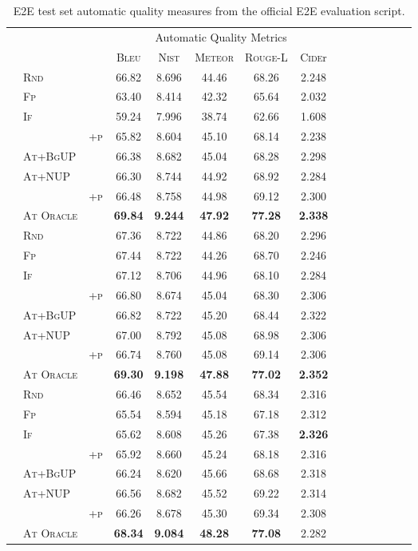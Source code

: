 \begin{table*}
\begin{tabular}{lll c c c c  c c c c  c c c c}
 & & &  \multicolumn{5}{c}{Automatic Quality Metrics} \\
\cmidrule(lr){4-8} 
 & & &  \textsc{Bleu} &  \textsc{Nist} &  \textsc{Meteor} & \textsc{Rouge-L} & \textsc{Cide}r \\
\midrule
\parbox[t]{2mm}{}
&\textsc{Rnd} & &66.82&8.696&44.46&68.26&2.248 \\
&\textsc{Fp} & &63.40&8.414&42.32&65.64&2.032 \\
&\textsc{If} & &59.24&7.996&38.74&62.66&1.608 \\
&  & \textsc{+p}&65.82&8.604&45.10&68.14&2.238 \\
&\textsc{At+BgUP} & &66.38&8.682&45.04&68.28&2.298 \\
&\textsc{At+NUP} & &66.30&8.744&44.92&68.92&2.284 \\
&  & \textsc{+p}&66.48&8.758&44.98&69.12&2.300 \\
&\textsc{At Oracle} & &\textbf{69.84}&\textbf{9.244}&\textbf{47.92}&\textbf{77.28}&\textbf{2.338} \\
\midrule
\parbox[t]{2mm}{}
&\textsc{Rnd} & &67.36&8.722&44.86&68.20&2.296 \\
&\textsc{Fp} & &67.44&8.722&44.26&68.70&2.246 \\
&\textsc{If} & &67.12&8.706&44.96&68.10&2.284 \\
&  & \textsc{+p}&66.80&8.674&45.04&68.30&2.306 \\
&\textsc{At+BgUP} & &66.82&8.722&45.20&68.44&2.322 \\
&\textsc{At+NUP} & &67.00&8.792&45.08&68.98&2.306 \\
&  & \textsc{+p}&66.74&8.760&45.08&69.14&2.306 \\
&\textsc{At Oracle} & &\textbf{69.30}&\textbf{9.198}&\textbf{47.88}&\textbf{77.02}&\textbf{2.352} \\
\midrule
\parbox[t]{2mm}{}
&\textsc{Rnd} & &66.46&8.652&45.54&68.34&2.316 \\
&\textsc{Fp} & &65.54&8.594&45.18&67.18&2.312 \\
&\textsc{If} & &65.62&8.608&45.26&67.38&\textbf{2.326} \\
&  & \textsc{+p}&65.92&8.660&45.24&68.18&2.316 \\
&\textsc{At+BgUP} & &66.24&8.620&45.66&68.68&2.318 \\
&\textsc{At+NUP} & &66.56&8.682&45.52&69.22&2.314 \\
&  & \textsc{+p}&66.26&8.678&45.30&69.34&2.308 \\
&\textsc{At Oracle} & &\textbf{68.34}&\textbf{9.084}&\textbf{48.28}&\textbf{77.08}&2.282 \\
\midrule
\end{tabular}


\caption{E2E test set automatic quality measures from the official E2E evaluation script.}
\label{app:e2e.auto}
\end{table*}
